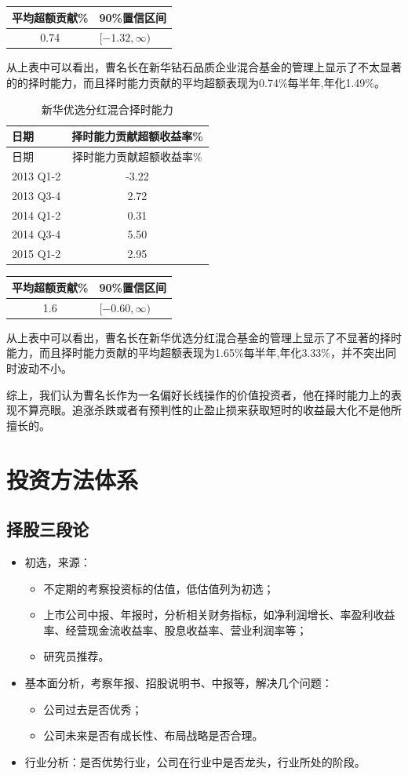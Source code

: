 \documentclass[hyperref,]{ctexart}
\begin{document}
\begin{longtable}[]{@{}cl@{}}
\toprule
平均超额贡献\% & 90\%置信区间\tabularnewline
\midrule
\endhead
0.74 & \([-1.32,\infty)\)\tabularnewline
\bottomrule
\end{longtable}

从上表中可以看出，曹名长在新华钻石品质企业混合基金的管理上显示了不太显著的的择时能力，而且择时能力贡献的平均超额表现为0.74\%每半年,年化1.49\%。

\begin{longtable}[]{@{}lc@{}}
\caption{新华优选分红混合择时能力}\tabularnewline
\toprule
日期 & 择时能力贡献超额收益率\%\tabularnewline
\midrule
\endfirsthead
\toprule
日期 & 择时能力贡献超额收益率\%\tabularnewline
\midrule
\endhead
2013 Q1-2 & -3.22\tabularnewline
2013 Q3-4 & 2.72\tabularnewline
2014 Q1-2 & 0.31\tabularnewline
2014 Q3-4 & 5.50\tabularnewline
2015 Q1-2 & 2.95\tabularnewline
\bottomrule
\end{longtable}

\begin{longtable}[]{@{}cl@{}}
\toprule
平均超额贡献\% & 90\%置信区间\tabularnewline
\midrule
\endhead
1.6 & \([-0.60,\infty)\)\tabularnewline
\bottomrule
\end{longtable}

从上表中可以看出，曹名长在新华优选分红混合基金的管理上显示了不显著的择时能力，而且择时能力贡献的平均超额表现为1.65\%每半年,年化3.33\%，并不突出同时波动不小。

综上，我们认为曹名长作为一名偏好长线操作的价值投资者，他在择时能力上的表现不算亮眼。追涨杀跌或者有预判性的止盈止损来获取短时的收益最大化不是他所擅长的。

\section{投资方法体系}

\subsection{择股三段论}

\begin{itemize}
\item 初选，来源：
\begin{itemize}
  \item 不定期的考察投资标的估值，低估值列为初选；
  \item 上市公司中报、年报时，分析相关财务指标，如净利润增长、率盈利收益率、经营现金流收益率、股息收益率、营业利润率等；
  \item 研究员推荐。
  \end{itemize}
\item 基本面分析，考察年报、招股说明书、中报等，解决几个问题：
\begin{itemize}
  \item 公司过去是否优秀；
  \item 公司未来是否有成长性、布局战略是否合理。
\end{itemize}
\item 行业分析：是否优势行业，公司在行业中是否龙头，行业所处的阶段。
\end{itemize}
\end{document}
